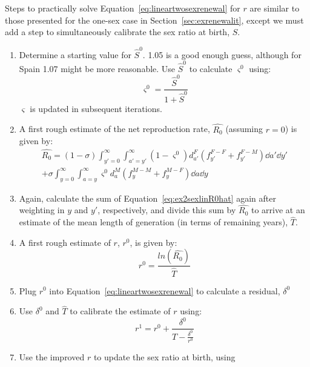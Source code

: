  \FloatBarrier
\label{sec:exrenewalit2}
Steps to practically solve Equation~\eqref{eq:lineartwosexrenewal} for $r$ are
similar to those presented for the one-sex case in
Section~\ref{sec:exrenewalit}, except we must add a step to simultaneously
calibrate the sex ratio at birth, $S$.
\begin{enumerate}
 \item Determine a starting value for $\hat{S}^0$. 1.05 is a good enough guess,
 although for Spain 1.07 might be more reasonable. Use $\hat{S}^0$ to 
 calculate $\varsigma^0$ using:
\begin{equation}
\label{eq:getvarsigmal}
\varsigma^0 = \frac{\hat{S}^0}{1+\hat{S}^0}
\end{equation}
$\varsigma$ is updated in subsequent iterations.
   \item A first rough estimate of the net reproduction rate, $\widehat{R_0}$ (assuming
  $r=0$) is given by: 
 \begin{equation}
 \label{eq:ex2sexlinR0hat}
 \begin{split}
 \widehat{R_0} = (1 - \sigma)  \int _{y'=0}^\infty \int_{a'=y'}^\infty 
                (1-\varsigma^0)d_{a'}^F \left(f_{y'}^{F-F} + f_{y'}^{F-M}\right)
                \dd a'\dd y' \\ + \sigma  \int _{y=0}^\infty \int _{a=y}^\infty 
               \varsigma^0 d_{a}^M  \left(f_{y}^{M-M}+ f_{y}^{M-F}\right) \dd a
               \dd y
 \end{split}
 \end{equation}
 \item Again, calculate the sum of Equation~\eqref{eq:ex2sexlinR0hat} again
 after weighting in $y$ and $y'$, respectively, and divide this sum by
 $\widehat{R_0}$ to arrive at an estimate of the mean length of generation (in
 terms of remaining years), $\widehat{T}$.
  \item A first rough estimate of $r$, $r^0$, is given by:
   \begin{equation}
   r^0 = \frac{ln(\widehat{R_0})}{\widehat{T}}
   \end{equation}
  \item Plug $r^0$ into Equation~\eqref{eq:lineartwosexrenewal} to calculate a
  residual, $\delta^0$
  \item Use $\delta^0$ and $\widehat{T}$ to calibrate the estimate of $r$
  using:
  \begin{equation}
  r^{1} = r^0 + \frac{\delta^0}{\widehat{T} - \frac{\delta^0}{r^0}}
  \end{equation}
  \item  Use the improved $r$ to update the sex ratio at birth, using

\end{enumerate}
